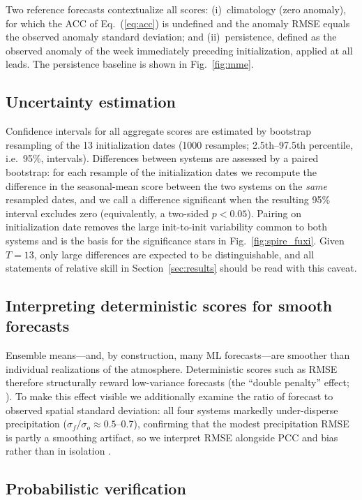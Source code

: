 \documentclass[11pt]{article}
\begin{document}
Two reference forecasts contextualize all scores: (i)~climatology
(zero anomaly), for which the ACC of Eq.~(\ref{eq:acc}) is undefined
and the anomaly RMSE equals the observed anomaly standard deviation;
and (ii)~persistence, defined as the observed anomaly of the week
immediately preceding initialization, applied at all leads.
The persistence baseline is shown in Fig.~\ref{fig:mme}.

\subsection{Uncertainty estimation}\label{sec:uncertainty}

Confidence intervals for all aggregate scores are estimated by
bootstrap resampling of the 13 initialization dates (1000 resamples;
2.5th--97.5th percentile, i.e.\ 95\%, intervals). Differences between
systems are assessed by a paired bootstrap: for each resample of the
initialization dates we recompute the difference in the seasonal-mean
score between the two systems on the \emph{same} resampled dates, and we
call a difference significant when the resulting 95\% interval excludes
zero (equivalently, a two-sided $p<0.05$). Pairing on initialization date
removes the large init-to-init variability common to both systems and is
the basis for the significance stars in Fig.~\ref{fig:spire_fuxi}. Given
$T=13$, only large differences are expected to be distinguishable, and
all statements of relative skill in Section~\ref{sec:results} should be
read with this caveat.

\subsection{Interpreting deterministic scores for smooth forecasts}
\label{sec:smoothing}

Ensemble means---and, by construction, many ML forecasts---are
smoother than individual realizations of the atmosphere. Deterministic
scores such as RMSE therefore structurally reward low-variance
forecasts (the ``double penalty'' effect;
\citealp{wilks2019,benbouallegue2024}). To make this effect visible we
additionally examine the ratio of forecast to observed spatial standard
deviation: all four systems markedly under-disperse precipitation
($\sigma_f/\sigma_o\approx0.5$--0.7), confirming that the modest
precipitation RMSE is partly a smoothing artifact, so we interpret RMSE
alongside PCC and bias rather than in isolation \citep{murphy1988}.

\subsection{Probabilistic verification}\label{sec:prob_methods}
\end{document}
